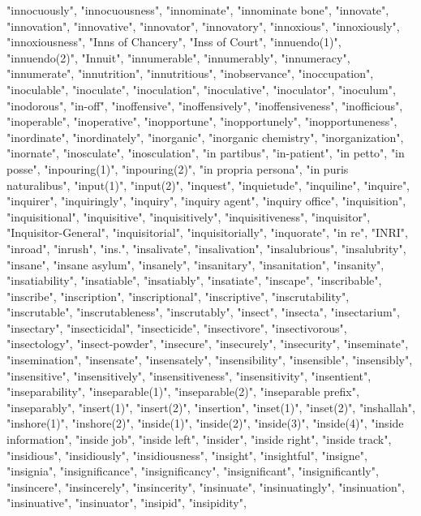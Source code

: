 "innocuously",
"innocuousness",
"innominate",
"innominate bone",
"innovate",
"innovation",
"innovative",
"innovator",
"innovatory",
"innoxious",
"innoxiously",
"innoxiousness",
"Inns of Chancery",
"Inss of Court",
"innuendo(1)",
"innuendo(2)",
"Innuit",
"innumerable",
"innumerably",
"innumeracy",
"innumerate",
"innutrition",
"innutritious",
"inobservance",
"inoccupation",
"inoculable",
"inoculate",
"inoculation",
"inoculative",
"inoculator",
"inoculum",
"inodorous",
"in-off",
"inoffensive",
"inoffensively",
"inoffensiveness",
"inofficious",
"inoperable",
"inoperative",
"inopportune",
"inopportunely",
"inopportuneness",
"inordinate",
"inordinately",
"inorganic",
"inorganic chemistry",
"inorganization",
"inornate",
"inosculate",
"inosculation",
"in partibus",
"in-patient",
"in petto",
"in posse",
"inpouring(1)",
"inpouring(2)",
"in propria persona",
"in puris naturalibus",
"input(1)",
"input(2)",
"inquest",
"inquietude",
"inquiline",
"inquire",
"inquirer",
"inquiringly",
"inquiry",
"inquiry agent",
"inquiry office",
"inquisition",
"inquisitional",
"inquisitive",
"inquisitively",
"inquisitiveness",
"inquisitor",
"Inquisitor-General",
"inquisitorial",
"inquisitorially",
"inquorate",
"in re",
"INRI",
"inroad",
"inrush",
"ins.",
"insalivate",
"insalivation",
"insalubrious",
"insalubrity",
"insane",
"insane asylum",
"insanely",
"insanitary",
"insanitation",
"insanity",
"insatiability",
"insatiable",
"insatiably",
"insatiate",
"inscape",
"inscribable",
"inscribe",
"inscription",
"inscriptional",
"inscriptive",
"inscrutability",
"inscrutable",
"inscrutableness",
"inscrutably",
"insect",
"insecta",
"insectarium",
"insectary",
"insecticidal",
"insecticide",
"insectivore",
"insectivorous",
"insectology",
"insect-powder",
"insecure",
"insecurely",
"insecurity",
"inseminate",
"insemination",
"insensate",
"insensately",
"insensibility",
"insensible",
"insensibly",
"insensitive",
"insensitively",
"insensitiveness",
"insensitivity",
"insentient",
"inseparability",
"inseparable(1)",
"inseparable(2)",
"inseparable prefix",
"inseparably",
"insert(1)",
"insert(2)",
"insertion",
"inset(1)",
"inset(2)",
"inshallah",
"inshore(1)",
"inshore(2)",
"inside(1)",
"inside(2)",
"inside(3)",
"inside(4)",
"inside information",
"inside job",
"inside left",
"insider",
"inside right",
"inside track",
"insidious",
"insidiously",
"insidiousness",
"insight",
"insightful",
"insigne",
"insignia",
"insignificance",
"insignificancy",
"insignificant",
"insignificantly",
"insincere",
"insincerely",
"insincerity",
"insinuate",
"insinuatingly",
"insinuation",
"insinuative",
"insinuator",
"insipid",
"insipidity",
